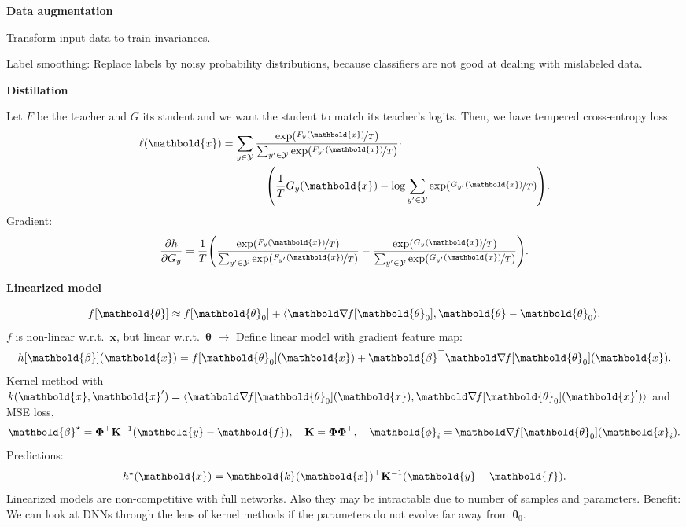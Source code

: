 \documentclass[10pt]{article}
\newenvironment{topic}[1]
{\textbf{\sffamily \footnotesize \colorbox{black}{\rlap{\textbf{\textcolor{white}{#1}}}\hspace{\linewidth}\hspace{-2\fboxsep}}}}
{}
\newenvironment{subtopic}[1]
{\begin{center}\textbf{\footnotesize \sffamily #1}\end{center}}
{}
\renewcommand{\mat}[1]{\ensuremath{\mathbf{#1}}}
\renewcommand{\vec}[1]{\ensuremath{\mathbold{#1}}}
\begin{document}
\begin{multicols*}{3}
\begin{topic}{Tricks of the trade}
        \begin{subtopic}{Data augmentation}
            Transform input data to train invariances.

            Label smoothing: Replace labels by noisy probability distributions, because classifiers are not
            good at dealing with mislabeled data.
        \end{subtopic}

        \begin{subtopic}{Distillation}
            Let $F$ be the teacher and $G$ its student and we want the student to match its teacher's
            logits. Then, we have tempered cross-entropy loss:
            \begin{align*}
                \ell(\vec{x}) & = \sum_{y \in \mathcal{Y}} \frac{\exp(\nicefrac{F_y(\vec{x})}{T})}{\sum_{y' \in \mathcal{Y}} \exp(\nicefrac{F_{y'}(\vec{x})}{T})} \cdot \\
                              & \quad \quad \quad \quad \lft( \frac{1}{T} G_y(\vec{x}) - \log \sum_{y' \in \mathcal{Y}} \exp(\nicefrac{G_{y'}(\vec{x})}{T}) \rgt).
            \end{align*}
            Gradient: \[
                \pdv{h}{G_y} = \frac{1}{T} \lft( \frac{\exp(\nicefrac{F_y(\vec{x})}{T})}{\sum_{y' \in \mathcal{Y}} \exp(\nicefrac{F_{y'}(\vec{x})}{T})} - \frac{\exp(\nicefrac{G_y(\vec{x})}{T})}{\sum_{y' \in \mathcal{Y}} \exp(\nicefrac{G_{y'}(\vec{x})}{T})} \rgt).
            \]
        \end{subtopic}

    \end{topic}

    \begin{topic}{Neural tangent kernel}

        \begin{subtopic}{Linearized model}
            \[
                f[\vec{\theta}] \approx f[\vec{\theta}_0] + \langle \grad{f[\vec{\theta}_0]}{}, \vec{\theta} - \vec{\theta}_0 \rangle.
            \]
            $f$ is non-linear w.r.t.\ $\vec{x}$, but linear w.r.t.\ $\vec{\theta}$ $\rightarrow$ Define linear model with gradient feature map: \[
                h[\vec{\beta}](\vec{x}) = f[\vec{\theta}_0](\vec{x}) + \transpose{\vec{\beta}} \grad{f[\vec{\theta}_0](\vec{x})}{}.
            \]
            Kernel method with $k(\vec{x}, \vec{x}') = \langle \grad{f[\vec{\theta}_0](\vec{x})}{},
                \grad{f[\vec{\theta}_0](\vec{x}')}{} \rangle$ and MSE loss, \[
                \vec{\beta}^\star = \transpose{\mat{\Phi}} \inv{\mat{K}} (\vec{y}-\vec{f}), \quad \mat{K} = \mat{\Phi} \transpose{\mat{\Phi}}, \quad \vec{\phi}_i = \grad{f[\vec{\theta}_0](\vec{x}_i)}{}.
            \]
            Predictions: \[
                h^\star(\vec{x}) = \transpose{\vec{k}(\vec{x})} \inv{\mat{K}} (\vec{y} - \vec{f}).
            \]
            Linearized models are non-competitive with full networks. Also they may be intractable due to
            number of samples and parameters. Benefit: We can look at DNNs through the lens of kernel methods
            if the parameters do not evolve far away from $\vec{\theta}_0$.
        \end{subtopic}


\end{topic}
\end{multicols*}
\end{document}

